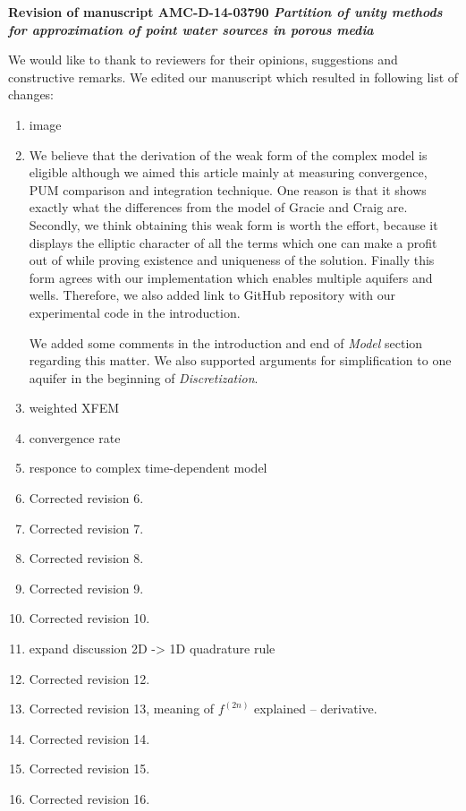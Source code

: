 \documentclass[a4paper,11pt]{article}
\begin{document}
{
\begin{center}
{\Large\bf Revision of manuscript AMC-D-14-03790 
\newline
\newline
\emph{Partition of unity methods for approximation of point water sources in porous media}}
\end{center}
}

We would like to thank to reviewers for their opinions, suggestions and constructive remarks.
We edited our manuscript which resulted in following list of changes:

\begin{enumerate}
\item image %
\item %
      We believe that the derivation of the weak form of the complex model is eligible
      although we aimed this article mainly at measuring convergence, PUM comparison and integration technique.
      One reason is that it shows exactly what the differences from the model of Gracie and Craig are.
      Secondly, we think obtaining this weak form is worth the effort, because it displays the elliptic
      character of all the terms which one can make a profit out of while proving existence and uniqueness of the solution.
      Finally this form agrees with our implementation which enables multiple aquifers and wells.
      Therefore, we also added link to GitHub repository with our experimental code in the introduction.
      
      We added some comments in the introduction and end of \emph{Model} section regarding this matter.
      We also supported arguments for simplification to one aquifer in the beginning of \emph{Discretization}.
\item weighted XFEM %
\item convergence rate %
\item responce to complex time-dependent model %

\item Corrected revision 6. %
\item Corrected revision 7. %
\item Corrected revision 8. %
\item Corrected revision 9. %
\item Corrected revision 10. %

\item expand discussion 2D -> 1D quadrature rule %

\item Corrected revision 12. %
\item Corrected revision 13, meaning of $f^{(2n)}$ explained -- derivative. %
\item Corrected revision 14. %
\item Corrected revision 15. %
\item Corrected revision 16. %


\end{enumerate}
\end{document}
